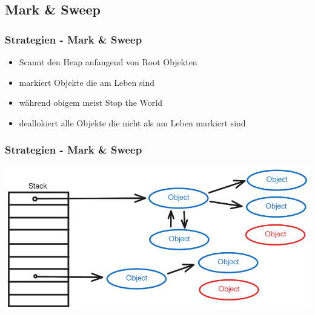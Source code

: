 \documentclass{beamer}
\begin{document}
        \subsection{Mark \& Sweep}
            \begin{frame}
                \frametitle{Strategien - Mark \& Sweep}
                \begin{itemize}
                    \item Scannt den Heap anfangend von Root Objekten
                    \item markiert Objekte die am Leben sind
                    \item während obigem meist Stop the World
                    \item deallokiert alle Objekte die nicht als am Leben markiert sind
                \end{itemize}
            \end{frame}

            \begin{frame}
                \frametitle{Strategien - Mark \& Sweep}
                \includegraphics[width=\textwidth]{images/Mark_nd_Sweep.png}
            \end{frame}
\end{document}
